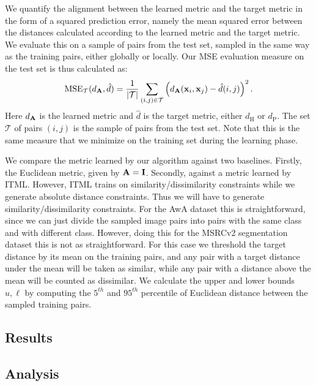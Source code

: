 We quantify the alignment between the learned metric and the target metric in the form of a squared prediction error, namely the mean squared error between the distances calculated according to the learned metric and the target metric.  We evaluate this on a sample of pairs from the test set, sampled in the same way as the training pairs, either globally or locally. Our \ac{MSE} evaluation measure on the test set is thus calculated as:
\begin{equation}
\text{MSE}_{\mathcal{T}}(d_{\mathbf{A}}, \hat{d}) = 
\frac{1}{|\mathcal{T}|}\sum_{(i,j) \in \mathcal{T}} \left(d_{\mathbf{A}}(\mathbf{x}_i, \mathbf{x}_j) - \hat{d}(i, j)\right)^2.
\end{equation} 
Here $d_{\mathbf{A}}$ is the learned metric and $\hat{d}$ is the target metric, either $d_{\text{H}}$ or $d_{\text{P}}$. The set $\mathcal{T}$ of pairs $(i,j)$ is the sample of pairs from the test set. Note that this is the same measure that we minimize on the training set during the learning phase.

We compare the metric learned by our algorithm against two baselines. Firstly, the Euclidean metric, given by $\mathbf{A} = \mathbf{I}$. Secondly, against a metric learned by \acf{ITML}. \cite{davis2007information} However, \ac{ITML} trains on similarity/dissimilarity constraints while we generate absolute distance constraints. Thus we will have to generate similarity/dissimilarity constraints. For the \ac{AwA} dataset this is straightforward, since we can just divide the sampled image pairs into pairs with the same class and with different class. However, doing this for the \ac{MSRCv2} segmentation dataset this is not as straightforward. For this case we threshold the target distance by its mean on the training pairs, and any pair with a target distance under the mean will be taken as similar, while any pair with a distance above the mean will be counted as dissimilar. We calculate the upper and lower bounds $u, \ell$ by computing the $5^{th}$ and $95^{th}$ percentile of Euclidean distance between the sampled training pairs.

\subsection{Results}


\subsection{Analysis}



